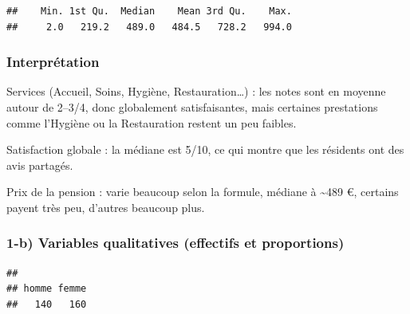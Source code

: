 \documentclass[
]{article}
\newenvironment{Shaded}{\begin{snugshade}}{\end{snugshade}}
\newcommand{\CommentTok}[1]{\textcolor[rgb]{0.56,0.35,0.01}{\textit{#1}}}
\newcommand{\FunctionTok}[1]{\textcolor[rgb]{0.13,0.29,0.53}{\textbf{#1}}}
\newcommand{\NormalTok}[1]{#1}
\newcommand{\SpecialCharTok}[1]{\textcolor[rgb]{0.81,0.36,0.00}{\textbf{#1}}}
\begin{document}
\begin{Shaded}
\end{Shaded}

\begin{verbatim}
##    Min. 1st Qu.  Median    Mean 3rd Qu.    Max. 
##     2.0   219.2   489.0   484.5   728.2   994.0
\end{verbatim}

\subsubsection{Interprétation}\label{interpruxe9tation}

Services (Accueil, Soins, Hygiène, Restauration\ldots) : les notes sont
en moyenne autour de 2--3/4, donc globalement satisfaisantes, mais
certaines prestations comme l'Hygiène ou la Restauration restent un peu
faibles.

Satisfaction globale : la médiane est 5/10, ce qui montre que les
résidents ont des avis partagés.

Prix de la pension : varie beaucoup selon la formule, médiane à
\textasciitilde489 €, certains payent très peu, d'autres beaucoup plus.

\subsubsection{1-b) Variables qualitatives (effectifs et
proportions)}\label{b-variables-qualitatives-effectifs-et-proportions}

\begin{Shaded}
\end{Shaded}

\begin{verbatim}
## 
## homme femme 
##   140   160
\end{verbatim}

\begin{Shaded}
\end{Shaded}
\end{document}
